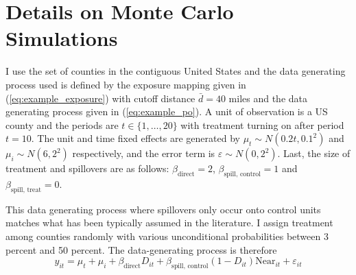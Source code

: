 \documentclass[11pt]{article}
\begin{document}
\section{Details on Monte Carlo Simulations}
\label{sec:monte_carlo}

I use the set of counties in the contiguous United States and the data generating process used is defined by the exposure mapping given in (\ref{eq:example_exposure}) with cutoff distance $\bar{d} = 40$ miles and the data generating process given in (\ref{eq:example_po}). A unit of observation is a US county and the periods are $t \in \{1, \dots, 20\}$ with treatment turning on after period $t = 10$. The unit and time fixed effects are generated by $\mu_t \sim N(0.2t, 0.1^2)$ and $\mu_i \sim N(6, 2^2)$ respectively, and the error term is $\varepsilon \sim N(0, 2^2)$. Last, the size of treatment and spillovers are as follows: $\beta_{\text{direct}} = 2$, $\beta_{\text{spill, control}} = 1$ and $\beta_{\text{spill, treat}} = 0$.

This data generating process where spillovers only occur onto control units matches what has been typically assumed in the literature. I assign treatment among counties randomly with various unconditional probabilities between 3 percent and 50 percent. The data-generating process is therefore 
\begin{equation}
    \label{eq:dgp1} 
    y_{it} = \mu_t + \mu_i + \beta_{\text{direct}} D_{it} + \beta_{\text{spill, control}} (1-D_{it}) \text{Near}_{it} + \varepsilon_{it}   
\end{equation}
\end{document}
